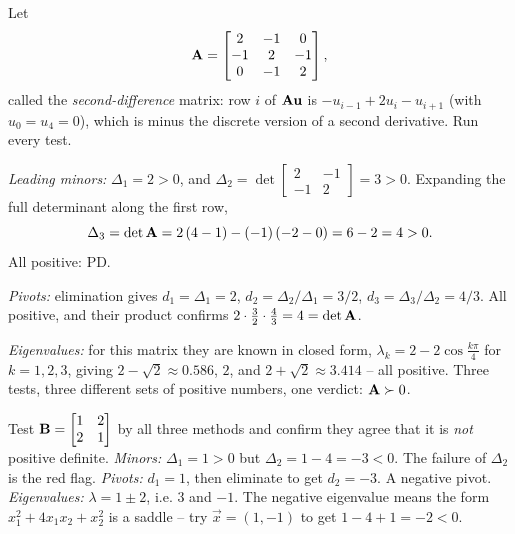 \begin{example}
\label{ch27:ex-allthree}
Let
\[
  \mathbf{A} = \begin{bmatrix} 2 & -1 & 0 \\ -1 & 2 & -1 \\ 0 & -1 & 2 \end{bmatrix},
\]
called the \emph{second-difference} matrix: row $i$ of $\mathbf{A}\mathbf{u}$ is $-u_{i-1} + 2u_i -
u_{i+1}$ (with $u_0 = u_4 = 0$), which is minus the discrete version of a second derivative. Run
every test.

\emph{Leading minors:} $\Delta_1 = 2 > 0$, and $\Delta_2 = \det\begin{bmatrix}2&-1\\-1&2\end{bmatrix}
= 3 > 0$. Expanding the full determinant along the first row,
\[
  \Delta_3 = \det\mathbf{A} = 2\,(4-1) - (-1)\,(-2-0) = 6 - 2 = 4 > 0.
\]
All positive: PD.

\emph{Pivots:} elimination gives $d_1 = \Delta_1 = 2$, $d_2 = \Delta_2/\Delta_1 = 3/2$, $d_3 =
\Delta_3/\Delta_2 = 4/3$. All positive, and their product confirms $2 \cdot \tfrac32 \cdot \tfrac43 = 4 = \det\mathbf{A}$.

\emph{Eigenvalues:} for this matrix they are known in closed form, $\lambda_k = 2 - 2\cos\frac{k\pi}{4}$
for $k=1,2,3$, giving $2-\sqrt2 \approx 0.586$, $2$, and $2+\sqrt2 \approx 3.414$ -- all positive.
Three tests, three different sets of positive numbers, one verdict: $\mathbf{A}\succ 0$.
\end{example}

\begin{labbox}
Test $\mathbf{B} = \begin{bmatrix} 1 & 2 \\ 2 & 1 \end{bmatrix}$ by all three methods and confirm they
agree that it is \emph{not} positive definite.
\emph{Minors:} $\Delta_1 = 1 > 0$ but $\Delta_2 = 1 - 4 = -3 < 0$. The failure of $\Delta_2$ is the
red flag.
\emph{Pivots:} $d_1 = 1$, then eliminate to get $d_2 = -3$. A negative pivot.
\emph{Eigenvalues:} $\lambda = 1 \pm 2$, i.e. $3$ and $-1$. The negative eigenvalue means the form
$x_1^2 + 4x_1x_2 + x_2^2$ is a saddle -- try $\vec{x}=(1,-1)$ to get $1 - 4 + 1 = -2 < 0$.
\end{labbox}

